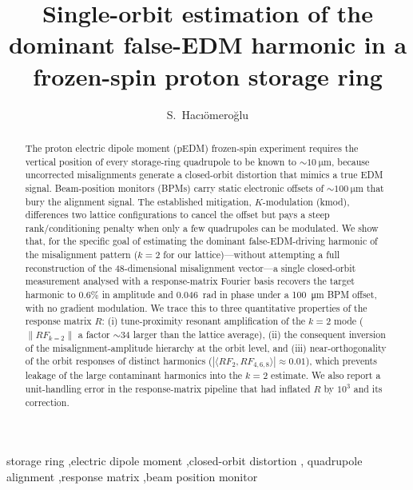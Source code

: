 \documentclass[preprint,12pt]{elsarticle}
\newcommand{\todo}[1]{{\color{red}\textbf{(TO BE DONE: #1)}}}
\begin{document}
\begin{frontmatter}

\title{Single-orbit estimation of the dominant false-EDM harmonic
in a frozen-spin proton storage ring}

\author[inst1]{S.~Hac\i\"omero\u{g}lu}

\address[inst1]{\todo{affiliation}}

\begin{abstract}
The proton electric dipole moment (pEDM) frozen-spin experiment requires
the vertical position of every storage-ring quadrupole to be known to
$\sim\SI{10}{\micro\meter}$, because uncorrected misalignments generate a
closed-orbit distortion that mimics a true EDM signal. Beam-position
monitors (BPMs) carry static electronic offsets of $\sim\SI{100}{\micro
\meter}$ that bury the alignment signal. The established mitigation,
$K$-modulation (kmod), differences two lattice configurations to cancel
the offset but pays a steep rank/conditioning penalty when only a few
quadrupoles can be modulated. We show that, for the specific goal of
estimating the dominant false-EDM-driving harmonic of the misalignment
pattern ($k=2$ for our lattice)---without attempting a full reconstruction
of the 48-dimensional misalignment vector---a single closed-orbit
measurement analysed with a response-matrix Fourier basis recovers the
target harmonic to $0.6\%$ in amplitude and \SI{0.046}{\radian} in phase
under a \SI{100}{\micro\meter} BPM offset, with no gradient modulation.
We trace this to three quantitative properties of the response matrix
$R$: (i) tune-proximity resonant amplification of the $k=2$ mode
($\|RF_{k=2}\|$ a factor $\sim$34 larger than the lattice average),
(ii) the consequent inversion of the misalignment-amplitude hierarchy at
the orbit level, and (iii) near-orthogonality of the orbit responses of
distinct harmonics ($|\langle RF_2,RF_{4,6,8}\rangle|\approx0.01$), which
prevents leakage of the large contaminant harmonics into the $k=2$
estimate. We also report a unit-handling error in the response-matrix
pipeline that had inflated $R$ by $10^3$ and its correction.
\end{abstract}

\begin{keyword}
storage ring \sep electric dipole moment \sep closed-orbit distortion \sep
quadrupole alignment \sep response matrix \sep beam position monitor
\end{keyword}

\end{frontmatter}
\end{document}
